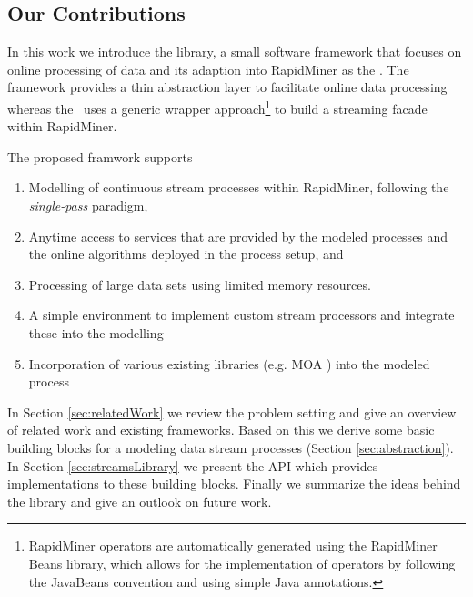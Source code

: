 \subsection{Our Contributions}
In this work we introduce the \streams library, a small software
framework that focuses on online processing of data and its adaption
into RapidMiner as the \plugin. The \streams framework provides a
thin abstraction layer to facilitate online data processing whereas
the \plugin\ uses a generic wrapper approach\footnote{RapidMiner
  operators are automatically generated using the \textsf{RapidMiner
    Beans} library, which allows for the implementation of operators
  by following the JavaBeans convention and using simple Java
  annotations.} to build a streaming facade within RapidMiner.

The proposed framwork supports
\begin{enumerate}
\item Modelling of continuous stream processes within RapidMiner,
  following the {\em single-pass} paradigm,
\item Anytime access to services that are provided by the modeled
  processes and the online algorithms deployed in the process setup,
  and
\item Processing of large data sets using limited memory resources.
\item A simple environment to implement custom stream processors and
  integrate these into the modelling
\item Incorporation of various existing libraries (e.g. MOA
  \cite{moa}) into the modeled process
\end{enumerate}

In Section
\ref{sec:relatedWork} we review the problem setting and give an
overview of related work and existing frameworks.
Based on this we derive some basic building blocks for a modeling data
stream processes (Section \ref{sec:abstraction}). In Section
\ref{sec:streamsLibrary} we present the \streams API which provides
implementations to these building blocks. Finally we summarize the
ideas behind the \streams library and give an outlook on future work.
